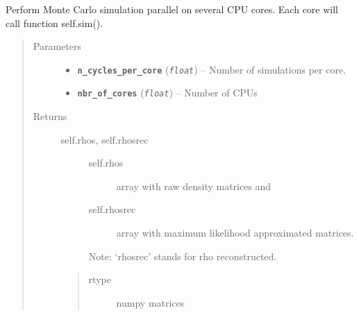\documentclass[letterpaper,10pt,english]{sphinxmanual}
\begin{document}
\begin{fulllineitems}
\begin{fulllineitems}
\label{modules:Tomography.Errorize.multiprocessing_simulate}
Perform Monte Carlo simulation parallel on several CPU cores. Each core will call function self.sim().
\begin{quote}\begin{description}
\item[{Parameters}] \leavevmode\begin{itemize}
\item {} 
\textbf{\texttt{n\_cycles\_per\_core}} (\emph{\texttt{float}}) -- Number of simulations per core.

\item {} 
\textbf{\texttt{nbr\_of\_cores}} (\emph{\texttt{float}}) -- Number of CPUs

\end{itemize}

\item[{Returns}] \leavevmode
\begin{description}
\item[{self.rhos, self.rhosrec}] \leavevmode\begin{description}
\item[{self.rhos}] \leavevmode
array with raw density matrices and

\item[{self.rhosrec}] \leavevmode
array with maximum likelihood approximated matrices.

\end{description}

Note: `rhosrec' stands for rho reconstructed.

\end{description}
\begin{quote}\begin{description}
\item[{rtype}] \leavevmode
numpy matrices

\end{description}\end{quote}


\end{description}\end{quote}

\end{fulllineitems}



\end{fulllineitems}
\end{document}
